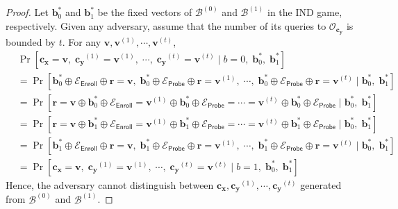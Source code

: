 \begin{proof}

Let $\mathbf{b}^*_0$ and $\mathbf{b}^*_1$ be the fixed vectors of $\mathcal{B}^{(0)}$ and $\mathcal{B}^{(1)}$ in the \textsf{IND} game, respectively. Given any adversary, assume that the number of its queries to $\mathcal{O}_{\mathbf{c_y}}$ is bounded by $t$. For any $\mathbf{v}, \mathbf{v}^{(1)}, \cdots, \mathbf{v}^{(t)}$,
\begin{align*}
	& \Pr[ \mathbf{c_x} = \mathbf{v},\; \mathbf{c_y}^{(1)} = \mathbf{v}^{(1)},\; \cdots,\; \mathbf{c_y}^{(t)} = \mathbf{v}^{(t)} \mid b = 0,\; \mathbf{b}^*_0,\; \mathbf{b}^*_1 ] \\
	&= \Pr[ \mathbf{b}^*_0 \oplus \mathcal{E}_{\textsf{Enroll}} \oplus \mathbf{r} = \mathbf{v},\; \mathbf{b}^*_0 \oplus \mathcal{E}_{\textsf{Probe}} \oplus \mathbf{r} =\mathbf{v}^{(1)},\; \cdots,\; \mathbf{b}^*_0 \oplus \mathcal{E}_{\textsf{Probe}} \oplus \mathbf{r} =\mathbf{v}^{(t)} \mid \mathbf{b}^*_0,\; \mathbf{b}^*_1] \\ 
	&= \Pr[ \mathbf{r} = \mathbf{v} \oplus \mathbf{b}^*_0 \oplus \mathcal{E}_{\textsf{Enroll}} =\mathbf{v}^{(1)} \oplus \mathbf{b}^*_0 \oplus \mathcal{E}_{\textsf{Probe}} = \cdots = \mathbf{v}^{(t)} \oplus \mathbf{b}^*_0 \oplus \mathcal{E}_{\textsf{Probe}} \mid \mathbf{b}^*_0,\; \mathbf{b}^*_1] \\ 
	&= \Pr[ \mathbf{r} = \mathbf{v} \oplus \mathbf{b}^*_1 \oplus \mathcal{E}_{\textsf{Enroll}} = \mathbf{v}^{(1)} \oplus \mathbf{b}^*_1 \oplus \mathcal{E}_{\textsf{Probe}} = \cdots = \mathbf{v}^{(t)} \oplus \mathbf{b}^*_1 \oplus \mathcal{E}_{\textsf{Probe}} \mid \mathbf{b}^*_0,\; \mathbf{b}^*_1] \\ 
	&= \Pr[ \mathbf{b}^*_1 \oplus \mathcal{E}_{\textsf{Enroll}} \oplus \mathbf{r} = \mathbf{v},\; \mathbf{b}^*_1 \oplus \mathcal{E}_{\textsf{Probe}} \oplus \mathbf{r} =\mathbf{v}^{(1)},\; \cdots,\; \mathbf{b}^*_1 \oplus \mathcal{E}_{\textsf{Probe}} \oplus \mathbf{r} =\mathbf{v}^{(t)} \mid \mathbf{b}^*_0,\; \mathbf{b}^*_1] \\ 
	&= \Pr[ \mathbf{c_x} = \mathbf{v},\; \mathbf{c_y}^{(1)} = \mathbf{v}^{(1)},\; \cdots,\; \mathbf{c_y}^{(t)} = \mathbf{v}^{(t)} \mid b = 1,\; \mathbf{b}^*_0,\; \mathbf{b}^*_1  ]
\end{align*}
Hence, the adversary cannot distinguish between $\mathbf{c_x}, \mathbf{c_y}^{(1)}, \cdots, \mathbf{c_y}^{(t)}$ generated from $\mathcal{B}^{(0)}$ and $\mathcal{B}^{(1)}$.

\end{proof}

